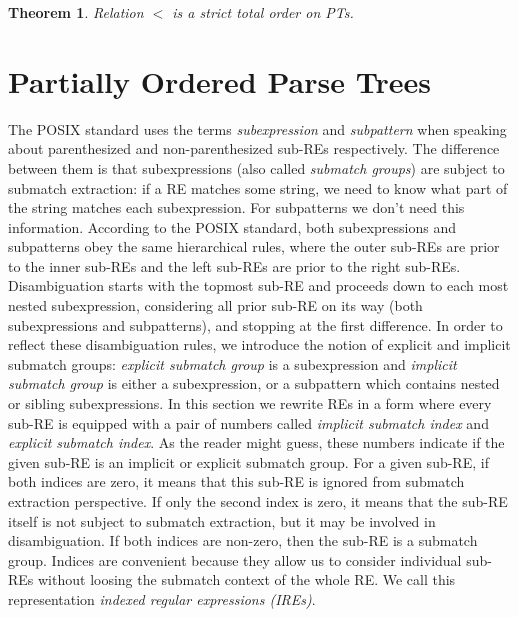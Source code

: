 \documentclass[AMA,STIX1COL]{WileyNJD-v2}
\newtheorem{XThe}{Theorem}
\begin{document}
    \begin{XThe}
    Relation $<$ is a strict total order on PTs.
    \end{XThe}



\section{Partially Ordered Parse Trees}

The POSIX standard uses the terms \emph{subexpression} and \emph{subpattern}
when speaking about parenthesized and non-parenthesized sub-REs respectively.
The difference between them is that
subexpressions (also called \emph{submatch groups}) are subject to submatch extraction:
if a RE matches some string, we need to know what part of the string matches each subexpression.
For subpatterns we don't need this information.
According to the POSIX standard, both subexpressions and subpatterns
obey the same hierarchical rules,
where the outer sub-REs are prior to the inner sub-REs and the left sub-REs are prior to the right sub-REs.
Disambiguation starts with the topmost sub-RE and proceeds down to each most nested subexpression,
considering all prior sub-RE on its way (both subexpressions and subpatterns),
and stopping at the first difference.
%
In order to reflect these disambiguation rules, we introduce the notion of explicit and implicit submatch groups:
\emph{explicit submatch group} is a subexpression
and \emph{implicit submatch group} is either a subexpression, or a subpattern which contains nested or sibling subexpressions.
In this section we rewrite REs in a form
where every sub-RE is equipped with a pair of numbers called
\emph{implicit submatch index} and \emph{explicit submatch index}.
As the reader might guess, these numbers indicate if the given sub-RE is an implicit or explicit submatch group.
%
For a given sub-RE,
if both indices are zero, it means that this sub-RE is ignored from submatch extraction perspective.
If only the second index is zero, it means that the sub-RE itself is not subject to submatch extraction,
but it may be involved in disambiguation.
If both indices are non-zero, then the sub-RE is a submatch group.
%
Indices are convenient because they allow us to consider individual sub-REs
without loosing the submatch context of the whole RE.
We call this representation \emph{indexed regular expressions (IREs)}.
\end{document}
